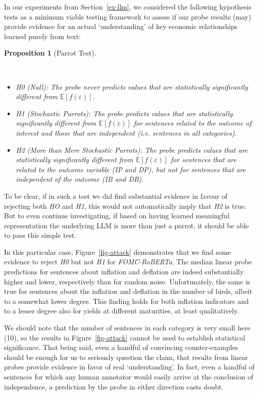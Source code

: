 \documentclass{article}
\theoremstyle{plain}
\newtheorem{proposition}[theorem]{Proposition}
\theoremstyle{definition}
\theoremstyle{remark}
\begin{document}
In our experiments from Section~\ref{ex-llm}, we considered the following hypothesis tests as a minimum viable testing framework to assess if our probe results (may) provide evidence for an actual `understanding' of key economic relationships learned purely from text:

\begin{proposition}[Parrot
Test]\protect\hypertarget{prp-line}{}\label{prp-line}

~

\begin{itemize}
\setlength\itemsep{1px}
\item
  \emph{H0 (Null)}: The probe never predicts values that are statistically significantly different from \(\mathbb{E}[f(\varepsilon)]\).
\item
  \emph{H1 (Stochastic Parrots)}: The probe predicts values that are statistically significantly different from \(\mathbb{E}[f(\varepsilon)]\) for sentences related to the outcome of interest \emph{and} those that are independent (i.e. sentences in all categories).
\item
  \emph{H2 (More than Mere Stochastic Parrots)}: The probe predicts values that are statistically significantly different from \(\mathbb{E} [f(\varepsilon)]\) for sentences that are related to the outcome variable (IP and DP), but not for sentences that are independent of the outcome (IB and DB).
\end{itemize}
\end{proposition}


To be clear, if in such a test we did find substantial evidence in favour of rejecting both \emph{HO} and \emph{H1}, this would not automatically imply that \emph{H2} is true. But to even continue investigating, if based on having learned meaningful representation the underlying LLM is more than just a parrot, it should be able to pass this simple test.

In this particular case, Figure~\ref{fig-attack} demonstrates that we find some evidence to reject \emph{H0} but not \emph{H1} for \emph{FOMC-RoBERTa}. The median linear probe predictions for sentences about inflation and deflation are indeed substantially higher and lower, respectively than for random noise. Unfortunately, the same is true for sentences about the inflation and deflation in the number of birds, albeit to a somewhat lower degree. This finding holds for both inflation indicators and to a lesser degree also for yields at different maturities, at least qualitatively.

We should note that the number of sentences in each category is very small here (10), so the results in Figure~\ref{fig-attack} cannot be used to establish statistical significance. That being said, even a handful of convincing counter-examples should be enough for us to seriously question the claim, that results from linear probes provide evidence in favor of real `understanding'. In fact, even a handful of sentences for which any human annotator would easily arrive at the conclusion of independence, a prediction by the probe in either direction casts doubt.
\end{document}
